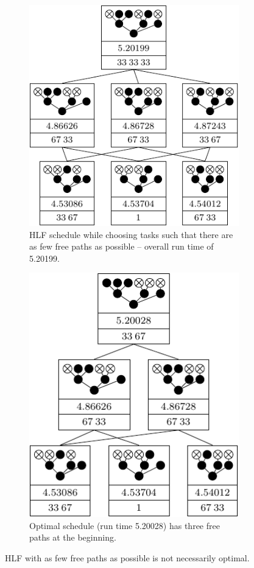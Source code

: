\begin{figure}[ht]
  \centering
  \begin{subfigure}{.45\textwidth}
    \centering
    \includegraphics{p3/hlfnfc_not_optimal/000111223_hlfnfc.pdf}
    \caption{HLF schedule while choosing tasks such that there are as few free paths as possible -- overall run time of 5.20199.}
  \end{subfigure}
  \quad
  \begin{subfigure}{.45\textwidth}
    \centering
    \includegraphics{p3/hlfnfc_not_optimal/000111223_opt.pdf}
    \caption{Optimal schedule (run time 5.20028) has three free paths at the beginning.}
  \end{subfigure}
  \caption{HLF with as few free paths as possible is not necessarily optimal.}
  \label{fig:hlfnfc-is-not-optimal}
\end{figure}


